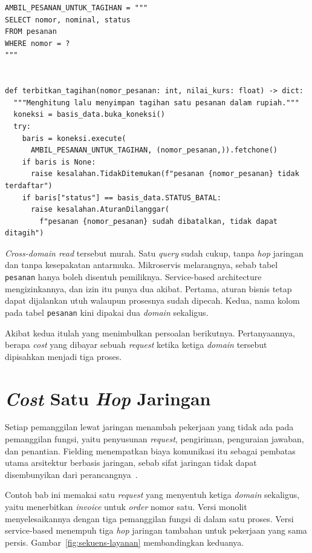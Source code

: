 \begin{lstlisting}[style=PythonStyle, caption={\textit{Cross-domain read} lewat basis
  data bersama, tersedia di
  \berkas{sources/chapter11/domain_penagihan.py}}, label=lst:penagihan]
AMBIL_PESANAN_UNTUK_TAGIHAN = """
SELECT nomor, nominal, status
FROM pesanan
WHERE nomor = ?
"""


def terbitkan_tagihan(nomor_pesanan: int, nilai_kurs: float) -> dict:
  """Menghitung lalu menyimpan tagihan satu pesanan dalam rupiah."""
  koneksi = basis_data.buka_koneksi()
  try:
    baris = koneksi.execute(
      AMBIL_PESANAN_UNTUK_TAGIHAN, (nomor_pesanan,)).fetchone()
    if baris is None:
      raise kesalahan.TidakDitemukan(f"pesanan {nomor_pesanan} tidak terdaftar")
    if baris["status"] == basis_data.STATUS_BATAL:
      raise kesalahan.AturanDilanggar(
        f"pesanan {nomor_pesanan} sudah dibatalkan, tidak dapat ditagih")
\end{lstlisting}

\textit{Cross-domain read}
tersebut murah. Satu \textit{query} sudah cukup, tanpa
\textit{hop} jaringan dan tanpa kesepakatan antarmuka.
Mikroservis melarangnya,
sebab tabel \texttt{pesanan} hanya boleh disentuh pemiliknya. Service-based architecture
mengizinkannya, dan izin itu punya dua akibat. Pertama, aturan bisnis tetap
dapat dijalankan utuh walaupun prosesnya sudah dipecah. Kedua, nama kolom pada
tabel \texttt{pesanan} kini dipakai dua \textit{domain} sekaligus.

Akibat kedua itulah yang menimbulkan persoalan berikutnya. Pertanyaannya,
berapa \textit{cost} yang dibayar sebuah \textit{request} ketika ketiga \textit{domain} tersebut
dipisahkan menjadi tiga proses.

\section{\textit{Cost} Satu \textit{Hop} Jaringan}

Setiap pemanggilan lewat jaringan menambah pekerjaan yang tidak ada pada
pemanggilan fungsi, yaitu penyusunan \textit{request}, pengiriman, penguraian
jawaban, dan penantian. Fielding menempatkan biaya komunikasi itu sebagai
pembatas utama arsitektur berbasis jaringan, sebab sifat jaringan tidak dapat
disembunyikan dari perancangnya~\cite{fielding2000architectural}.

Contoh bab ini memakai satu \textit{request} yang menyentuh ketiga \textit{domain} sekaligus,
yaitu menerbitkan \textit{invoice} untuk \textit{order} nomor satu. Versi monolit
menyelesaikannya dengan tiga pemanggilan fungsi di dalam satu proses. Versi
service-based menempuh tiga \textit{hop} jaringan tambahan untuk pekerjaan yang
sama persis. Gambar~\ref{fig:sekuens-layanan} membandingkan keduanya.

